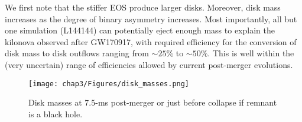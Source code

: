 We first note that the stiffer EOS produce larger disks. Moreover, disk mass increases as the degree of binary asymmetry increases. Most importantly, all but one simulation (L144144) can potentially eject enough mass to explain the kilonova observed after GW170917, with required efficiency for the conversion of disk mass to disk outflows ranging from $\sim 25\%$ to $\sim 50\%$. This is well within the (very uncertain) range of efficiencies allowed by current post-merger evolutions.



\begin{figure}[!htbp]
  \centering
\texttt{[image: chap3/Figures/disk\_masses.png]}
\caption{
  Disk masses at 7.5-ms post-merger or just before collapse if remnant is a black hole.
}
\label{fig:disk_masses}
\end{figure}

